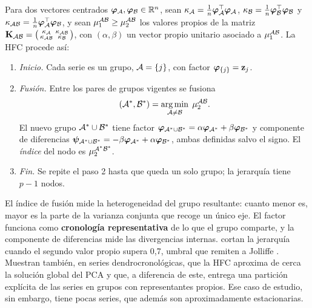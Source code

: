 \begin{definicion}\label{def:hfc}
Para dos vectores centrados $\boldsymbol{\varphi}_{\mathcal{A}},\boldsymbol{\varphi}_{\mathcal{B}}\in\mathbb{R}^n$, sean
$\kappa_{\mathcal{A}}=\frac1n\boldsymbol{\varphi}_{\mathcal{A}}^{\top}\boldsymbol{\varphi}_{\mathcal{A}}$, $\kappa_{\mathcal{B}}=\frac1n\boldsymbol{\varphi}_{\mathcal{B}}^{\top}\boldsymbol{\varphi}_{\mathcal{B}}$ y
$\kappa_{\mathcal{A}\mathcal{B}}=\frac1n\boldsymbol{\varphi}_{\mathcal{A}}^{\top}\boldsymbol{\varphi}_{\mathcal{B}}$, y sean $\mu_1^{\mathcal{A}\mathcal{B}}\ge\mu_2^{\mathcal{A}\mathcal{B}}$ los
valores propios de la matriz
$\mathbf{K}_{\mathcal{A}\mathcal{B}}=\bigl(\begin{smallmatrix}\kappa_{\mathcal{A}}&\kappa_{\mathcal{A}\mathcal{B}}\\ \kappa_{\mathcal{A}\mathcal{B}}&\kappa_{\mathcal{B}}
\end{smallmatrix}\bigr)$, con $(\alpha,\beta)$ un vector propio unitario asociado a
$\mu_1^{\mathcal{A}\mathcal{B}}$. La HFC procede así:
\begin{enumerate}[label=\arabic*.]
  \item \emph{Inicio.} Cada serie es un grupo, $\mathcal{A}=\{j\}$, con factor $\boldsymbol{\varphi}_{\{j\}}=\mathbf{z}_j$.
  \item \emph{Fusión.} Entre los pares de grupos vigentes se fusiona
    \begin{equation}\label{eq:hfc}
      (\mathcal{A}^\ast,\mathcal{B}^\ast)=\operatorname*{arg\,min}_{\mathcal{A}\ne\mathcal{B}}\;\mu_2^{\mathcal{A}\mathcal{B}}.
    \end{equation}
    El nuevo grupo $\mathcal{A}^\ast\cup\mathcal{B}^\ast$ tiene factor
    $\boldsymbol{\varphi}_{\mathcal{A}^\ast\cup\mathcal{B}^\ast}=\alpha\boldsymbol{\varphi}_{\mathcal{A}^\ast}+\beta\boldsymbol{\varphi}_{\mathcal{B}^\ast}$ y componente de
    diferencias $\boldsymbol{\psi}_{\mathcal{A}^\ast\cup\mathcal{B}^\ast}=-\beta\boldsymbol{\varphi}_{\mathcal{A}^\ast}+\alpha\boldsymbol{\varphi}_{\mathcal{B}^\ast}$, ambas
    definidas salvo el signo. El \emph{índice} del nodo es $\mu_2^{\mathcal{A}^\ast\mathcal{B}^\ast}$.
  \item \emph{Fin.} Se repite el paso 2 hasta que queda un solo grupo; la jerarquía tiene $p-1$
    nodos.
\end{enumerate}
\end{definicion}

El índice de fusión mide la heterogeneidad del grupo resultante: cuanto menor es, mayor es la
parte de la varianza conjunta que recoge un único eje. El factor funciona como \textbf{cronología
representativa} de lo que el grupo comparte, y la componente de diferencias mide las divergencias
internas. \textcite{camiz_et_al_2020} cortan la jerarquía cuando el segundo valor propio supera
0,7, umbral que remiten a Jolliffe \parencite[2002, como se cita en][]{camiz_et_al_2020}. Muestran
también, en series dendrocronológicas, que la HFC aproxima de cerca la solución global del PCA y
que, a diferencia de este, entrega una partición explícita de las series en grupos con
representantes propios. Ese caso de estudio, sin embargo, tiene pocas series, que además son
aproximadamente estacionarias.

